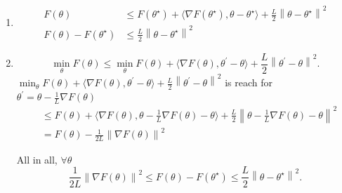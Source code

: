 \begin{enumerate}
    \item \begin{align*}
        F(\theta ) &\leq F(\theta ^\star ) + \langle \nabla F(\theta ^\star ) , \theta  - \theta ^\star \rangle + \frac{L}{2} \left\| \theta - \theta ^\star  \right\| ^2 \\
        F(\theta ) - F(\theta ^\star ) &\leq \frac{L}{2} \left\| \theta  - \theta ^\star  \right\| ^2 
    \end{align*}
    \item 
    \[
        \min_\theta  F(\theta ) \leq \min _\theta F(\theta ) + \langle \nabla F(\theta ), \theta ^\prime - \theta \rangle  + \frac{L}{2}\left\| \theta ^\prime - \theta  \right\| ^2
    .\]
    $ \min _\theta F(\theta ) + \langle \nabla F(\theta ), \theta ^\prime - \theta \rangle  + \frac{L}{2}\left\| \theta ^\prime - \theta  \right\| ^2 $  is reach for $ \theta ^\prime  = \theta - \frac{1}{L} \nabla F(\theta ) $ 
    \begin{align*}
        &\leq F(\theta ) + \langle \nabla F(\theta ), \theta  - \frac{1}{L} \nabla F(\theta ) - \theta  \rangle + \frac{L}{2} \left\| \theta  - \frac{1}{L} \nabla F(\theta ) - \theta  \right\| ^2 \\
        &= F(\theta ) - \frac{1}{2L} \left\| \nabla F(\theta ) \right\| ^2
    \end{align*}

    All in all, $ \forall \theta  $ 
    \[
        \frac{1}{2L} \left\| \nabla F(\theta ) \right\| ^2 \leq  F(\theta ) - F(\theta ^\star ) \leq  \frac{L}{2} \left\| \theta  - \theta ^\star  \right\| ^2
    .\]
\end{enumerate}

